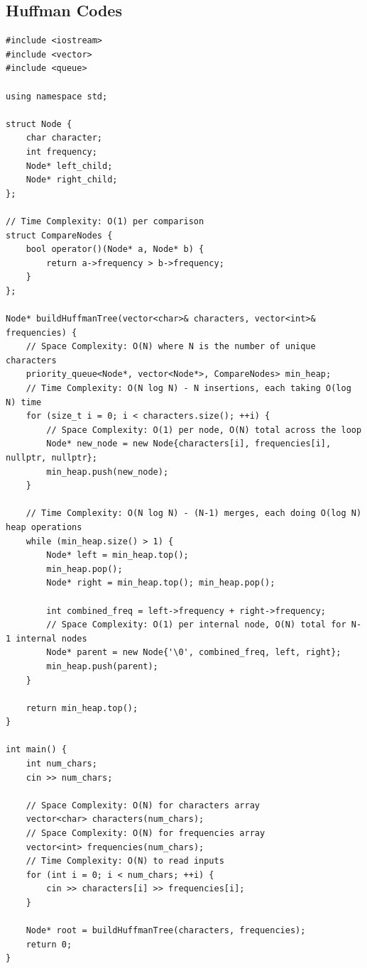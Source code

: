 \subsection{Huffman Codes}
\begin{lstlisting}
#include <iostream>
#include <vector>
#include <queue>

using namespace std;

struct Node {
    char character;
    int frequency;
    Node* left_child;
    Node* right_child;
};

// Time Complexity: O(1) per comparison
struct CompareNodes {
    bool operator()(Node* a, Node* b) {
        return a->frequency > b->frequency;
    }
};

Node* buildHuffmanTree(vector<char>& characters, vector<int>& frequencies) {
    // Space Complexity: O(N) where N is the number of unique characters
    priority_queue<Node*, vector<Node*>, CompareNodes> min_heap;
    // Time Complexity: O(N log N) - N insertions, each taking O(log N) time
    for (size_t i = 0; i < characters.size(); ++i) {
        // Space Complexity: O(1) per node, O(N) total across the loop
        Node* new_node = new Node{characters[i], frequencies[i], nullptr, nullptr};
        min_heap.push(new_node);
    }
    
    // Time Complexity: O(N log N) - (N-1) merges, each doing O(log N) heap operations
    while (min_heap.size() > 1) {
        Node* left = min_heap.top();
        min_heap.pop();
        Node* right = min_heap.top(); min_heap.pop();
        
        int combined_freq = left->frequency + right->frequency;
        // Space Complexity: O(1) per internal node, O(N) total for N-1 internal nodes
        Node* parent = new Node{'\0', combined_freq, left, right};
        min_heap.push(parent);
    }
    
    return min_heap.top(); 
}

int main() {
    int num_chars;
    cin >> num_chars;
    
    // Space Complexity: O(N) for characters array
    vector<char> characters(num_chars);
    // Space Complexity: O(N) for frequencies array
    vector<int> frequencies(num_chars);
    // Time Complexity: O(N) to read inputs
    for (int i = 0; i < num_chars; ++i) {
        cin >> characters[i] >> frequencies[i];
    }
    
    Node* root = buildHuffmanTree(characters, frequencies);
    return 0;
}
\end{lstlisting}

